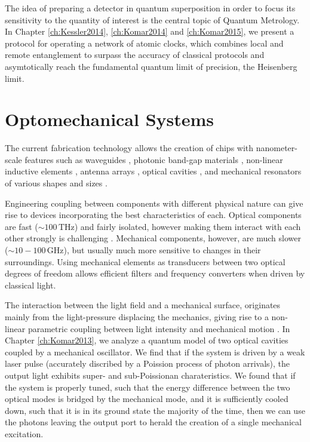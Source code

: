 The idea of preparing a detector in quantum
superposition in order to focus its sensitivity to the quantity of interest is
the central topic of Quantum Metrology. In Chapter \ref{ch:Kessler2014},
\ref{ch:Komar2014} and \ref{ch:Komar2015}, we present a
protocol for operating a network of atomic clocks, which combines local and
remote entanglement to surpass the accuracy of classical protocols and asymtotically
reach the fundamental quantum limit of precision, the Heisenberg limit. 


 
 
 
 
 
 
\section{Optomechanical Systems}
The current fabrication technology allows the creation of chips with
nanometer-scale features such as waveguides \cite{Mekis1996}, photonic band-gap
materials \cite{Foresi1997}, non-linear inductive elements \cite{Makhlin1999},
antenna arrays \cite{Yu2014}, optical cavities \cite{Painter2001}, and
mechanical resonators of various shapes and sizes \cite{Aspelmeyer2014}.

Engineering coupling between components with different physical nature can give
rise to devices incorporating the best characteristics of each. Optical
components are fast ($\sim 100\,\mathrm{THz}$) and fairly isolated, however
making them interact with each other strongly is challenging \cite{Chang2007}.
Mechanical components, however, are much slower ($\sim 10-100\,\mathrm{GHz}$),
but usually much more sensitive to changes in their surroundings. Using
mechanical elements as transducers between two optical degrees of freedom allows
efficient filters and frequency converters \cite{Eichenfield2009} when driven by
classical light.

The interaction between the light field and a mechanical surface, originates
mainly from the light-pressure displacing the mechanics, giving rise to a
non-linear parametric coupling between light intensity and mechanical motion
\cite{Meystre2013}. In Chapter \ref{ch:Komar2013}, we
analyze a quantum model of two optical cavities coupled by a mechanical
oscillator. We find that if the system is driven by a weak laser pulse
(accurately discribed by a Poission process of photon arrivals), the output
light exhibits super- and sub-Poissionan charateristics. We found that if the
system is properly tuned, such that the energy difference between
the two optical modes is bridged by the mechanical mode, and it is sufficiently
cooled down, such that it is in its ground state the majority of the time,
then we can use the photons leaving the output port to herald the creation of a
single mechanical excitation.

